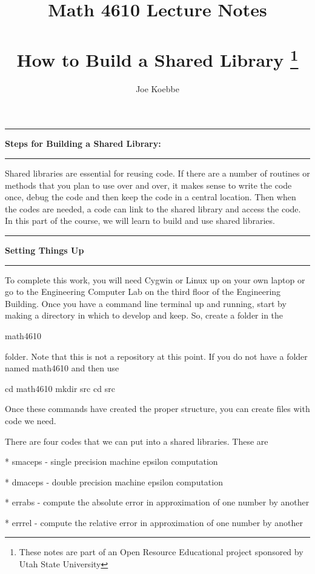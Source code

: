 \documentclass[10pt,fleqn]{article}
\title{Math 4610 Lecture Notes \\
            \ \\
            How to Build a Shared Library
  \footnote{These notes are part of an Open Resource Educational project
            sponsored by Utah State University}}
\author{Joe Koebbe}
\begin{document}
\maketitle
\newpage
\vskip0.1in\hrule\vskip0.1in
\noindent
{\bf Steps for Building a Shared Library:}
\vskip0.1in\hrule\vskip0.1in
\noindent
Shared libraries are essential for reusing code. If there are a number of
routines or methods that you plan to use over and over, it makes sense to write
the code once, debug the code and then keep the code in a central location. Then
when the codes are needed, a code can link to the shared library and access the
code. In this part of the course, we will learn to build and use shared
libraries.
\vskip0.1in\hrule\vskip0.1in
{\large{\bf Setting Things Up}}
\vskip0.1in\hrule\vskip0.1in
\noindent
To complete this work, you will need Cygwin or Linux up on your own laptop or go
to the Engineering Computer Lab on the third floor of the Engineering Building.
Once you have a command line terminal up and running, start by making a
directory in which to develop and keep. So, create a folder in the

     math4610

folder. Note that this is not a repository at this point. If you do not have a
folder named math4610 and then use

     cd math4610
     mkdir src
     cd src

Once these commands have created the proper structure, you can create files with
code we need.

There are four codes that we can put into a shared libraries. These are

* smaceps - single precision machine epsilon computation

* dmaceps - double precision machine epsilon computation

* errabs - compute the absolute error in approximation of one number by another

* errrel - compute the relative error in approximation of one number by another
\end{document}
